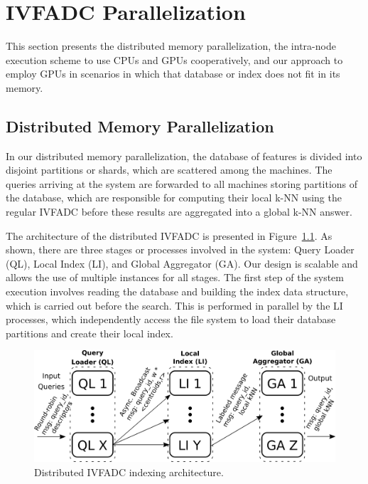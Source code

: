 \chapter{IVFADC Parallelization}
\label{sec:parallel}

This section presents the distributed memory parallelization, the intra-node execution scheme to 
use CPUs and GPUs cooperatively, and our approach to employ GPUs in 
scenarios in which that database or index does not fit in its memory.


\section{Distributed Memory Parallelization}


In our distributed memory parallelization, the database of features 
is divided into disjoint partitions or shards, which are scattered among the machines. The 
queries arriving at the system are forwarded to all machines storing partitions 
of the database, which are responsible for computing their local k-NN using the 
regular IVFADC before these results are aggregated into a global k-NN answer.

The architecture of the distributed IVFADC is presented in Figure~\ref{fig:arch}. As 
shown, there are three stages or processes involved in the system: Query 
Loader (QL), Local Index (LI), and Global Aggregator (GA). 
Our design is scalable and allows the use of multiple instances for all stages.
The first step of the system execution involves reading the database and building the index 
data structure, which is carried out before the search. 
This is performed in parallel by 
the LI processes, which independently access the file system to load their database 
partitions and create their local index. 

\begin{figure}[htbp]
\centerline{\includegraphics[width=0.97\columnwidth]{figs/pq-arch.png}}
\caption{Distributed IVFADC indexing architecture.}
\label{fig:arch}
\end{figure}


